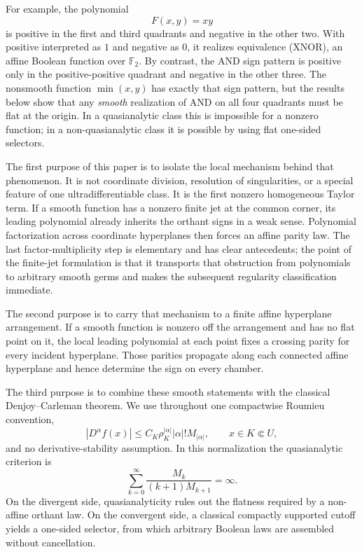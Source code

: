 \documentclass[11pt]{article}
\theoremstyle{definition}
\theoremstyle{remark}
\newcommand{\Ftwo}{\mathbb{F}_2}
\begin{document}
For example, the polynomial
\[
F(x,y)=xy
\]
is positive in the first and third quadrants and negative in the other two. With positive interpreted as $1$ and negative as $0$, it realizes equivalence (XNOR), an affine Boolean function over $\Ftwo$. By contrast, the AND sign pattern is positive only in the positive-positive quadrant and negative in the other three. The nonsmooth function $\min(x,y)$ has exactly that sign pattern, but the results below show that any \emph{smooth} realization of AND on all four quadrants must be flat at the origin. In a quasianalytic class this is impossible for a nonzero function; in a non-quasianalytic class it is possible by using flat one-sided selectors.

The first purpose of this paper is to isolate the local mechanism behind that phenomenon. It is not coordinate division, resolution of singularities, or a special feature of one ultradifferentiable class. It is the first nonzero homogeneous Taylor term. If a smooth function has a nonzero finite jet at the common corner, its leading polynomial already inherits the orthant signs in a weak sense. Polynomial factorization across coordinate hyperplanes then forces an affine parity law. The last factor-multiplicity step is elementary and has clear antecedents; the point of the finite-jet formulation is that it transports that obstruction from polynomials to arbitrary smooth germs and makes the subsequent regularity classification immediate.

The second purpose is to carry that mechanism to a finite affine hyperplane arrangement. If a smooth function is nonzero off the arrangement and has no flat point on it, the local leading polynomial at each point fixes a crossing parity for every incident hyperplane. Those parities propagate along each connected affine hyperplane and hence determine the sign on every chamber.

The third purpose is to combine these smooth statements with the classical Denjoy--Carleman theorem. We use throughout one compactwise Roumieu convention,
\[
 |D^\alpha f(x)|\le C_K\rho_K^{|\alpha|}|\alpha|!M_{|\alpha|},
 \qquad x\in K\Subset U,
\]
and no derivative-stability assumption. In this normalization the quasianalytic criterion is
\[
 \sum_{k=0}^{\infty}\frac{M_k}{(k+1)M_{k+1}}=\infty.
\]
On the divergent side, quasianalyticity rules out the flatness required by a non-affine orthant law. On the convergent side, a classical compactly supported cutoff yields a one-sided selector, from which arbitrary Boolean laws are assembled without cancellation.
\end{document}
